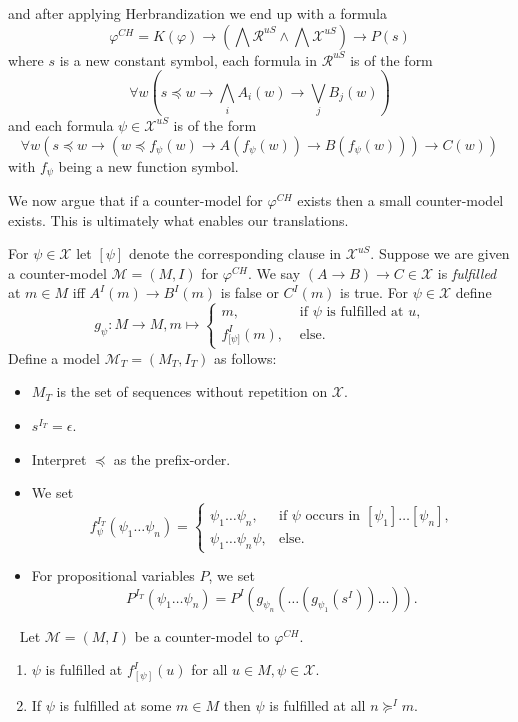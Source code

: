 \documentclass[runningheads]{llncs}
\begin{document}
and after applying Herbrandization we end up with a formula $$\varphi^{CH} = K(\varphi)\to\left(\bigwedge\mathcal R^{uS}\wedge \bigwedge\mathcal X^{uS}\right)\to P(s)$$ where $s$ is a new constant symbol, each formula in $\mathcal R^{uS}$ is of the form
$$\forall w\left(s\preceq w\to\bigwedge_iA_i(w)\to\bigvee_jB_j(w)\right)$$
and each formula $\psi\in\mathcal X^{uS}$ is of the form
$$\forall w(s\preceq w\to(w\preceq f_\psi(w)\to A(f_\psi(w))\to B(f_\psi(w)))\to C(w))$$
with $f_\psi$ being a new function symbol.

We now argue that if a counter-model for $\varphi^{CH}$ exists then a small counter-model exists. This is ultimately what enables our translations.

\begin{definition}
For $\psi\in\mathcal X$ let $[\psi]$ denote the corresponding clause in $\mathcal X^{uS}$. Suppose we are given a counter-model $\mathcal M = (M, I)$ for $\varphi^{CH}$.
We say $(A\to B)\to C\in\mathcal X$ is \emph{fulfilled} at $m\in M$ iff $A^I(m)\to B^I(m)$ is false or $C^I(m)$ is true. For $\psi\in\mathcal X$ define $$g_\psi : M\to M, m\mapsto\begin{cases}
		m,&\text{ if $\psi$ is fulfilled at $u$,}\\
		f^I_{\lbrack\psi\rbrack}(m),&\text{ else.}		
	\end{cases}$$Define a model $\mathcal M_T = (M_T, I_T)$ as follows:
	\begin{itemize}
		\item $M_T$ is the set of sequences without repetition on $\mathcal X$.
		\item $s^{I_T} = \epsilon$.
		\item Interpret $\preceq$ as the prefix-order.
		\item We set $$f_\psi^{I_T}(\psi_1\dots\psi_n) = \begin{cases}
			\psi_1\dots\psi_n, &\text{if $\psi$ occurs in $[\psi_1]\dots[\psi_n]$,}\\
			\psi_1\dots\psi_n\psi, &\text{else.}			
		\end{cases}$$
		\item For propositional variables $P$, we set $$P^{I_T}\left(\psi_1\dots \psi_n\right) = P^I\left(g_{\psi_n}\left(\dots\left(g_{\psi_1}\left(s^I\right)\right)\dots\right)\right).$$
	\end{itemize}
\end{definition}
\begin{lemma}~\label{thm:prop-countermodel-reduction}
	Let $\mathcal M = (M, I)$ be a counter-model to $\mathcal \varphi^{CH}$.
	\begin{enumerate}
		\item $\psi$ is fulfilled at $f_{[\psi]}^I(u)$ for all $u\in M, \psi\in\mathcal X$.
		\item If $\psi$ is fulfilled at some $m\in M$ then $\psi$ is fulfilled at all $n\succeq^I m$.
	\end{enumerate}
\end{lemma}
\end{document}
